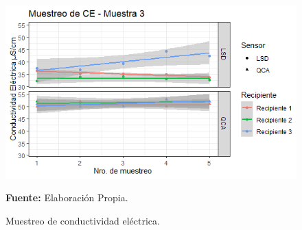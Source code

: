     \begin{figure}[H]
        \centering
        \includegraphics[width=0.75\linewidth]{Imagenes/cap4/CE_M3.png}
        \caption {Muestreo de conductividad el\'ectrica. }{\textbf{Fuente:}
        Elaboraci\'on Propia. }
        \label{fig:M3CE}
    \end{figure}

